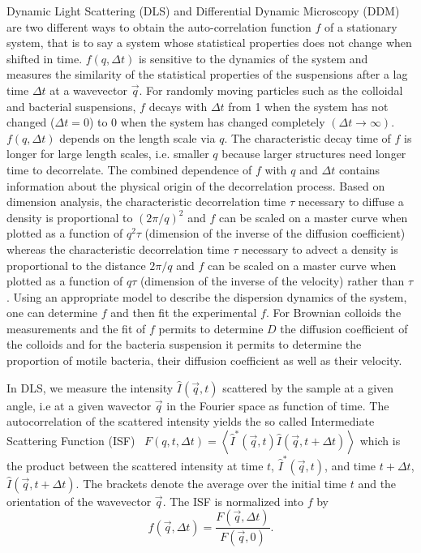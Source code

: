 \documentclass[prb,reprint,amsmath,amssymb]{revtex4-1}
\newcommand{\tg}[1]{{\color{magenta}#1}} %
\begin{document}
Dynamic Light Scattering (DLS) and Differential Dynamic Microscopy (DDM) are two different ways to obtain the auto-correlation function \tg{$f$}\cite{ajp1995passmore} of a stationary system, that is to say a system whose statistical properties does not change when shifted in time. \tg{$f(q, \Delta t)$ is sensitive to the dynamics of the system and measures the similarity of the statistical properties of the suspensions after a lag time $\Delta t$ at a wavevector $\vec{q}$. For randomly moving particles such as the colloidal and bacterial suspensions, $f$ decays with $\Delta t$ from 1 when the system has not changed ($\Delta t=0$) to 0 when the system has changed completely $(\Delta t\rightarrow\infty)$. $f(q, \Delta t)$ depends on the length scale via  $q$. The characteristic decay time of $f$ is longer for large length scales, i.e. smaller $q$ because larger structures need longer time to decorrelate. The combined dependence of $f$ with $q$ and $\Delta t$ contains information about the physical origin of the decorrelation process. Based on dimension analysis, the characteristic decorrelation time $\tau$ necessary to diffuse a density is proportional to $(2\pi/q)^2$ and $f$ can be scaled on a master curve when plotted as a function of $q^2\tau$ (dimension of the inverse of the diffusion coefficient) whereas the characteristic decorrelation time $\tau$ necessary to advect a density is proportional to the distance $2\pi/q$ and $f$ can be scaled on a master curve when plotted as a function of $q\tau$ (dimension of the inverse of the velocity) rather than $\tau$. Using an appropriate model to describe the dispersion dynamics of the system, one can determine $f$ and then fit the experimental $f$. For Brownian colloids the measurements and the fit of $f$ permits to determine $D$ the diffusion coefficient of the colloids and for the bacteria suspension it permits to determine the proportion of motile bacteria, their diffusion coefficient as well as their velocity.}

In DLS, we measure the intensity $\hat{I}(\vec{q}, t)$ scattered by the sample at a given angle, i.e at a given wavector $\vec{q}$ in the Fourier space as function of time. The autocorrelation of the scattered intensity yields the so called Intermediate Scattering Function (ISF)~\cite{19_goodman2005introduction} $F(q, t, \Delta t) = \left\langle \hat{I}^*(\vec{q}, t) \hat{I}(\vec{q}, t+\Delta t) \right\rangle$ \tg{which is the product between the scattered intensity at time $t$,  $\hat{I}^*(\vec{q}, t)$, and time $t+\Delta t$, $\hat{I}(\vec{q}, t+\Delta t)$.} The brackets denote the average over the initial time $t$ and the orientation of the wavevector $\vec{q}$. The ISF is normalized into $f$ by
\begin{equation}
f(\vec{q}, \Delta t) = \frac{F(\vec{q}, \Delta t)}{F(\vec{q}, 0)}.
\end{equation}
\end{document}
